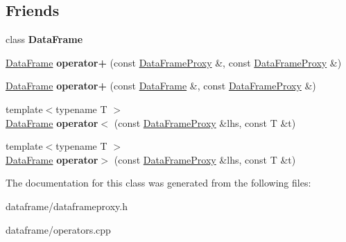 \subsection*{Friends}
\begin{DoxyCompactItemize}
\item 
\mbox{\label{classDataFrame_1_1DataFrameProxy_ac3cf826bc43b8ab4740915b5c60e7166}} 
class {\bfseries Data\+Frame}
\item 
\mbox{\label{classDataFrame_1_1DataFrameProxy_ac7252ac5b8145feb97ce0b16040cdbde}} 
\hyperlink{classDataFrame}{Data\+Frame} {\bfseries operator+} (const \hyperlink{classDataFrame_1_1DataFrameProxy}{Data\+Frame\+Proxy} \&, const \hyperlink{classDataFrame_1_1DataFrameProxy}{Data\+Frame\+Proxy} \&)
\item 
\mbox{\label{classDataFrame_1_1DataFrameProxy_a32fc0676af70bd35bf83e11c9ab946fc}} 
\hyperlink{classDataFrame}{Data\+Frame} {\bfseries operator+} (const \hyperlink{classDataFrame}{Data\+Frame} \&, const \hyperlink{classDataFrame_1_1DataFrameProxy}{Data\+Frame\+Proxy} \&)
\item 
\mbox{\label{classDataFrame_1_1DataFrameProxy_aaa1e3264e141ab931043d7f50c784394}} 
{\footnotesize template$<$typename T $>$ }\\\hyperlink{classDataFrame}{Data\+Frame} {\bfseries operator$<$} (const \hyperlink{classDataFrame_1_1DataFrameProxy}{Data\+Frame\+Proxy} \&lhs, const T \&t)
\item 
\mbox{\label{classDataFrame_1_1DataFrameProxy_a32bee46933cf3c0a26f549928805ba22}} 
{\footnotesize template$<$typename T $>$ }\\\hyperlink{classDataFrame}{Data\+Frame} {\bfseries operator$>$} (const \hyperlink{classDataFrame_1_1DataFrameProxy}{Data\+Frame\+Proxy} \&lhs, const T \&t)
\end{DoxyCompactItemize}


The documentation for this class was generated from the following files\+:\begin{DoxyCompactItemize}
\item 
dataframe/dataframeproxy.\+h\item 
dataframe/operators.\+cpp\end{DoxyCompactItemize}
